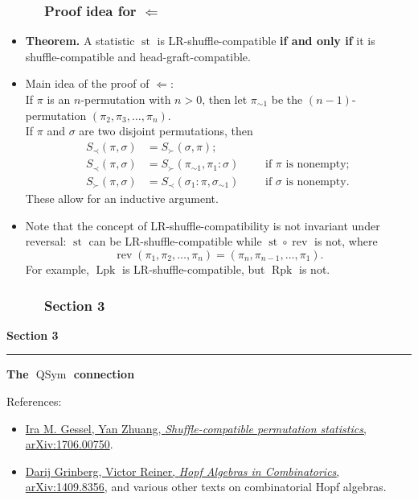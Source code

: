 \documentclass{beamer}
\newcommand{\red}{\color{red}}
\newcommand{\Lpk}{\operatorname{Lpk}}
\newcommand{\Rpk}{\operatorname{Rpk}}
\newcommand{\st}{\operatorname{st}}
\newcommand{\QSym}{\operatorname{QSym}}
\newcommand{\rev}{\operatorname{rev}}
\newcommand{\fti}[1]{\frametitle{\ \ \ \ \ #1}}
\newcommand{\tup}[1]{\left( #1 \right)}
\theoremstyle{plain}
\begin{document}
\begin{frame}
\fti{Proof idea for $\Longleftarrow$}

\begin{itemize}

\item \textbf{Theorem.}
      A statistic $\st$ is LR-shuffle-compatible \textbf{if and only if}
      it is shuffle-compatible and head-graft-compatible.

\pause
\item Main idea of the proof of $\Longleftarrow$: \\
      If $\pi$ is an $n$-permutation with $n > 0$, then let
      $\pi_{\sim1}$ be the $\left(  n-1\right)$-permutation
      $\left(  \pi_{2},\pi_{3},\ldots,\pi_{n}\right)  $. \\
      \pause
      If $\pi$ and $\sigma$ are two disjoint permutations,
      then
      \begin{align*}
      S_{\prec}\left(  \pi,\sigma\right) &=S_{\succ}\left( \sigma,\pi\right) ; \\
      S_{\prec}\left( \pi,\sigma\right) &=S_{\succ}\left(  \pi_{\sim1},\pi_{1}:\sigma\right) 
      \qquad \text{ if $\pi$ is nonempty}; \\
      S_{\succ}\left(  \pi,\sigma\right) &=S_{\prec}\left(  \sigma_{1}:\pi,\sigma_{\sim 1}\right)
      \qquad \text{ if $\sigma$ is nonempty}.
      \end{align*}
      These allow for an inductive argument.
\pause

\item Note that the concept of LR-shuffle-compatibility is
      not invariant under reversal: $\st$ can be
      LR-shuffle-compatible while $\st \circ \rev$ is not,
      where
      \[
      \rev \tup{\pi_1, \pi_2, \ldots, \pi_n}
      = \tup{\pi_n, \pi_{n-1}, \ldots, \pi_1} .
      \]
      For example, $\Lpk$ is LR-shuffle-compatible, but
      $\Rpk$ is not.

\end{itemize}
\vspace{10cm}
\end{frame}

\begin{frame}
\fti{Section 3}
\begin{center}
{\LARGE \bf Section 3} \\
\noindent\rule[0.5ex]{\linewidth}{1pt}
{\Large \bf The $\QSym$ connection}
\end{center}
\vspace{1cm}
References:
\begin{itemize}
\item \href{https://arxiv.org/abs/1706.00750}{\red Ira M. Gessel, Yan Zhuang, \textit{Shuffle-compatible permutation statistics}, arXiv:1706.00750}.
\item \href{http://arxiv.org/abs/1409.8356}{\red Darij Grinberg, Victor Reiner, \textit{Hopf Algebras in Combinatorics}, arXiv:1409.8356},
      and various other texts on combinatorial Hopf algebras.
\end{itemize}
\end{frame}
\end{document}

